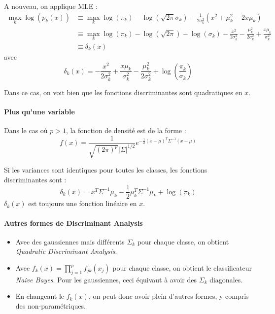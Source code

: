             A nouveau, on applique MLE :
            \begin{align*}
                \max_k \log(p_k(x)) &\equiv \max_k \log(\pi_k) - \log(\sqrt{2\pi}\sigma_k) - \frac{1}{2 \sigma_k^2} (x^2 + \mu_k^2 - 2x\mu_k)\\
                &\equiv \max_k \log(\pi_k) - \log(\sqrt{2\pi}) - \log(\sigma_k) - \frac{x^2}{2\sigma_k^2} - \frac{\mu_k^2}{2 \sigma_k^2} + \frac{x \mu_k}{\sigma_k^2}\\
                &\equiv \delta_k(x)
            \end{align*}
            avec 
            \[
                \delta_k(x) = -\frac{x^2}{2\sigma_k^2} + \frac{x \mu_k}{\sigma_k^2} - \frac{\mu_k^2}{2\sigma_k^2} + \log\left(\frac{\pi_k}{\sigma_k}\right)
            \]
            
            Dans ce cas, on voit bien que les fonctions discriminantes sont quadratiques en \(x\).

        \paragraph{Plus qu'une variable}
            Dans le cas où \(p > 1\), la fonction de densité est de la forme :
            \[
                f(x) = \frac{1}{\sqrt{(2\pi)^p} |\Sigma|^{1/2}} e^{-\frac{1}{2}(x - \mu)^T \Sigma^{-1}(x-\mu)}
            \]

            Si les variances sont identiques pour toutes les classes,
            les fonctions discriminantes sont :
            \[
                \delta_k(x) = x^T \Sigma^{-1} \mu_k - \frac{1}{2}\mu_k^T \Sigma^{-1} \mu_k + \log(\pi_k)
            \]
            \(\delta_k(x)\) est toujours une fonction linéaire en \(x\).

        \paragraph{Autres formes de Discriminant Analysis}
            \begin{itemize}
                \item Avec des gaussiennes mais différents \(\Sigma_k\) pour chaque classe, on obtient \textit{Quadratic Discriminant Analysis}.
                \item Avec \(f_k(x) = \prod_{j=1}^p f_{jk}(x_j)\) pour chaque classe, on obtient le classificateur \textit{Naive Bayes}. Pour les gaussiennes, ceci équivaut à avoir des \(\Sigma_k\) diagonales.
                \item En changeant le \(f_k(x)\), on peut donc avoir plein d'autres formes, y compris des non-paramétriques.
            \end{itemize}

